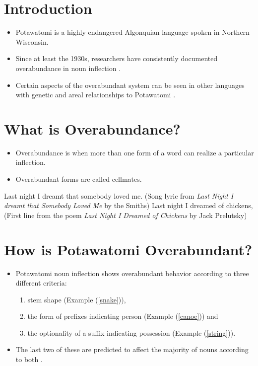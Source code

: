\section{Introduction}

\begin{itemize}
\item Potawatomi is a highly endangered Algonquian language spoken in
  Northern Wisconsin.
\item Since at least the 1930s, researchers have consistently
  documented overabundance in noun inflection
  \citep{hockett1948potawatomi2, potdict, lockwood2017potawatomi}.
\item Certain aspects of the overabundant system can be seen in other
  languages with genetic and areal relationships to Potawatomi
  \citep{odawagrammar, ahenakew1987cree}.
\end{itemize}

\section{What is Overabundance?}

\begin{itemize}
\item Overabundance \citep{thornton2011overabundance,
    thornton2012reduction} is when more than one form of a word can
  realize a particular inflection.
\item Overabundant forms are called cellmates.
\end{itemize}

\pex
\a Last night I dreamt that somebody loved me. (Song lyric from {\it Last Night I dreamt that Somebody Loved Me} by the Smiths)
\a Last night I dreamed of chickens, (First line from the poem {\it Last Night I Dreamed of Chickens} by Jack Prelutsky)
\xe

\section{How is Potawatomi Overabundant?}

\begin{itemize}
\item Potawatomi noun inflection shows overabundant behavior according
  to three different criteria:
  \begin{enumerate}
  \item stem shape (Example (\ref{snake})),
  \item the form of prefixes indicating person (Example (\ref{canoe}))
    and
  \item the optionality of a suffix indicating possession (Example
    (\ref{string})).
  \end{enumerate}
\item The last two of these are predicted to affect the majority of
  nouns according to both \citet{hockett1948potawatomi2,
    lockwood2017potawatomi}.
\end{itemize}

